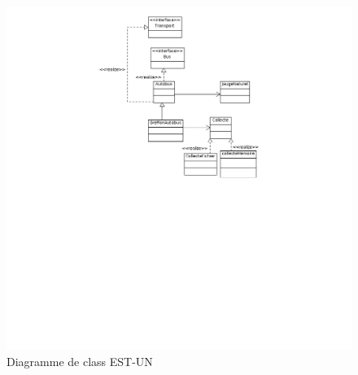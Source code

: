 \documentclass[a4paper,11pt]{article}
\begin{document}
\begin{figure}

    \caption{Diagramme de class EST-UN}
    \includegraphics[scale=0.4]{est-un.png}

\end{figure}
\end{document}
